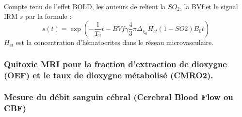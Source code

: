 \par


\par
Compte tenu de l'effet BOLD, les auteurs de \cite{christen2012l} relient la $SO_2$, la BVf et le signal IRM $s$ par la formule :
\begin{equation}
s(t)=\exp\left(-\frac{1}{T_2}t-BVf\gamma\frac{4}{3}\pi\Delta_{\chi_0}H_{ct}(1-SO2)B_0t\right)
\label{bold_so2}
\end{equation}
$H_{ct}$ est la concentration d'h\'ematocrites dans le r\'eseau microvasculaire.

\subsubsection{Quitoxic MRI pour la fraction d'extraction de dioxygne (OEF) %
et le taux de dioxygne m\'etabolis\'e (CMRO2).}








\subsubsection{Mesure du d\'ebit sanguin c\'ebral (Cerebral Blood Flow ou CBF)}






